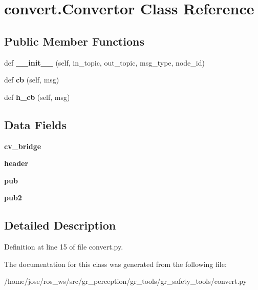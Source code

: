 \hypertarget{classconvert_1_1Convertor}{}\section{convert.\+Convertor Class Reference}
\label{classconvert_1_1Convertor}
\subsection*{Public Member Functions}
\begin{DoxyCompactItemize}
\item 
\mbox{\label{classconvert_1_1Convertor_a3390ece91d91fcb47ec5ffd1659fc1c9}} 
def {\bfseries \+\_\+\+\_\+init\+\_\+\+\_\+} (self, in\+\_\+topic, out\+\_\+topic, msg\+\_\+type, node\+\_\+id)
\item 
\mbox{\label{classconvert_1_1Convertor_a7cefe1432d24d514cc3cdd422d468b9f}} 
def {\bfseries cb} (self, msg)
\item 
\mbox{\label{classconvert_1_1Convertor_afc82a7bb485e2bf0572a29114165ede1}} 
def {\bfseries h\+\_\+cb} (self, msg)
\end{DoxyCompactItemize}
\subsection*{Data Fields}
\begin{DoxyCompactItemize}
\item 
\mbox{\label{classconvert_1_1Convertor_a0a97cf5105b42ad6f1edf2d312561679}} 
{\bfseries cv\+\_\+bridge}
\item 
\mbox{\label{classconvert_1_1Convertor_a56d6424cbd964621adbe2b8f14fdddb2}} 
{\bfseries header}
\item 
\mbox{\label{classconvert_1_1Convertor_a5e3bb02333ef9f8d23f2ea37500eb8c5}} 
{\bfseries pub}
\item 
\mbox{\label{classconvert_1_1Convertor_a9aa92d580bfd70719d070f439434a73b}} 
{\bfseries pub2}
\end{DoxyCompactItemize}


\subsection{Detailed Description}


Definition at line 15 of file convert.\+py.



The documentation for this class was generated from the following file\+:\begin{DoxyCompactItemize}
\item 
/home/jose/ros\+\_\+ws/src/gr\+\_\+perception/gr\+\_\+tools/gr\+\_\+safety\+\_\+tools/convert.\+py\end{DoxyCompactItemize}
